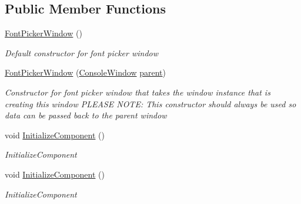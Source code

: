 \subsection*{Public Member Functions}
\begin{DoxyCompactItemize}
\item 
\hyperlink{class_c_p_u___o_s___simulator_1_1_font_picker_window_ac395cdfa521446c47bfded624bbfdba6}{Font\+Picker\+Window} ()
\begin{DoxyCompactList}\small\item\em Default constructor for font picker window \end{DoxyCompactList}\item 
\hyperlink{class_c_p_u___o_s___simulator_1_1_font_picker_window_a8ff9dfbc882890c0b7b76468d51dd386}{Font\+Picker\+Window} (\hyperlink{class_c_p_u___o_s___simulator_1_1_console_window}{Console\+Window} \hyperlink{class_c_p_u___o_s___simulator_1_1_font_picker_window_a4e59cc593e060f3229adc8decfeb151c}{parent})
\begin{DoxyCompactList}\small\item\em Constructor for font picker window that takes the window instance that is creating this window P\+L\+E\+A\+S\+E N\+O\+T\+E\+: This constructor should always be used so data can be passed back to the parent window \end{DoxyCompactList}\item 
void \hyperlink{class_c_p_u___o_s___simulator_1_1_font_picker_window_aca751fede84bf642f74ddf1030cbf034}{Initialize\+Component} ()
\begin{DoxyCompactList}\small\item\em Initialize\+Component \end{DoxyCompactList}\item 
void \hyperlink{class_c_p_u___o_s___simulator_1_1_font_picker_window_aca751fede84bf642f74ddf1030cbf034}{Initialize\+Component} ()
\begin{DoxyCompactList}\small\item\em Initialize\+Component \end{DoxyCompactList}\end{DoxyCompactItemize}
